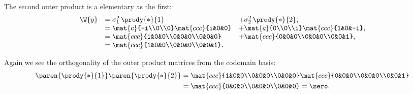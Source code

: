 The second outer product is a elementary as the first:
\begin{equation}
  \begin{array}{lll}
     \W{y} &= \sigma_{1}^{2}\, \prody{*}{1} &+ \sigma_{2}^{2}\, \prody{*}{2},\\
      &= \mat{c}{-i\\0\\0}\mat{ccc}{i&0&0} &+
         \mat{c}{0\\0\\i}\mat{ccc}{1&0&-i},\\
      &= \mat{ccc}{1&0&0\\0&0&0\\0&0&0} &+
         \mat{ccc}{0&0&0\\0&0&0\\0&0&1},\\
      &= \mat{ccc}{1&0&0\\0&0&0\\0&0&1}.
  \end{array}
\end{equation}

Again we see the orthogonality of the outer product matrices from the codomain basis:
\begin{equation}
  \begin{split}
     \paren{\prody{*}{1}} \paren{\prody{*}{2}} &=
     \mat{ccc}{1&0&0\\0&0&0\\0&0&0}
     \mat{ccc}{0&0&0\\0&0&0\\0&0&1} \\
     & = \mat{ccc}{0&0&0\\0&0&0\\0&0&0} = \zero.
  \end{split}
\end{equation}

\endinput